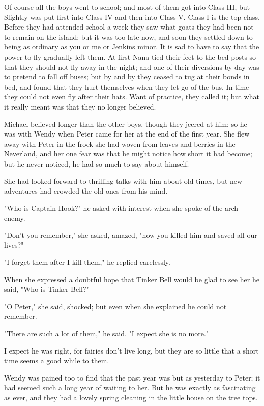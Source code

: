 Of course all the boys went to school;
and most of them got into Class III,
but Slightly was put first into Class IV and then into Class V\@.
Class I is the top class.
Before they had attended school a week they saw what goats they had been not to remain on the island;
but it was too late now, and soon they settled down to being as ordinary as you or me or Jenkins minor.
It is sad to have to say that the power to fly gradually left them.
At first Nana tied their feet to the bed-posts so that they should not fly away in the night;
and one of their diversions by day was to pretend to fall off buses;
but by and by they ceased to tug at their bonds in bed,
and found that they hurt themselves when they let go of the bus.
In time they could not even fly after their hats.
Want of practice, they called it;
but what it really meant was that they no longer believed.

Michael believed longer than the other boys, though they jeered at him;
so he was with Wendy when Peter came for her at the end of the first year.
She flew away with Peter in the frock she had woven from leaves and berries in the Neverland,
and her one fear was that he might notice how short it had become;
but he never noticed, he had so much to say about himself.

She had looked forward to thrilling talks with him about old times,
but new adventures had crowded the old ones from his mind.

"Who is Captain Hook?\@" he asked with interest when she spoke of the arch enemy.

"Don't you remember," she asked, amazed, "how you killed him and saved all our lives?"

"I forget them after I kill them," he replied carelessly.

When she expressed a doubtful hope that Tinker Bell would be glad to see her
he said, "Who is Tinker Bell?"

"O Peter," she said, shocked;
but even when she explained he could not remember.

"There are such a lot of them," he said.
"I expect she is no more."

I expect he was right, for fairies don't live long,
but they are so little that a short time seems a good while to them.

Wendy was pained too to find that the past year was but as yesterday to Peter;
it had seemed such a long year of waiting to her.
But he was exactly as fascinating as ever,
and they had a lovely spring cleaning in the little house on the tree tops.

